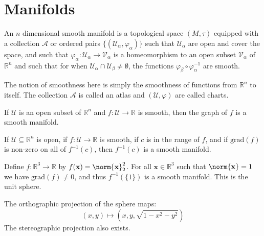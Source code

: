 \documentclass{article}                                                        %
\begin{document}
    \section{Manifolds}
        \begin{definition}
            An $n$ dimensional smooth manifold is a topological space $(M,\tau)$
            equipped with a collection $\mathcal{A}$ or ordered pairs
            $\{(\mathcal{U}_{\alpha},\varphi_{\alpha})\}$ such that
            $\mathcal{U}_{\alpha}$ are open and cover the space, and such that
            $\varphi_{\alpha}:\mathcal{U}_{\alpha}\rightarrow\mathcal{V}_{\alpha}$
            is a homeomorphism to an open subset $\mathcal{V}_{\alpha}$ of
            $\mathbb{R}^{n}$ and such that for when
            $\mathcal{U}_{\alpha}\cap\mathcal{U}_{\beta}\ne\emptyset$, the
            functions $\varphi_{\beta}\circ\varphi_{\alpha}^{\minus{1}}$
            are smooth.
        \end{definition}
        The notion of smoothness here is simply the smoothness of functions
        from $\mathbb{R}^{n}$ to itself. The collection $\mathcal{A}$ is called
        an atlas and $(\mathcal{U},\varphi)$ are called charts.
        \begin{example}
            If $\mathcal{U}$ is an open subset of $\mathbb{R}^{n}$ and
            $f:\mathcal{U}\rightarrow\mathbb{R}$ is smooth, then the
            graph of $f$ is a smooth manifold.
        \end{example}
        \begin{example}
            If $\mathcal{U}\subseteq\mathbb{R}^{n}$ is open, if
            $f:\mathcal{U}\rightarrow\mathbb{R}$ is smooth, if $c$ is in the
            range of $f$, and if $\textrm{grad}(f)$ is non-zero on all of
            $f^{\minus{1}}(c)$, then $f^{\minus{1}}(c)$ is a smooth manifold.
        \end{example}
        \begin{example}
            Define $f:\mathbb{R}^{3}\rightarrow\mathbb{R}$ by
            $f(\mathbf{x})=\norm{\mathbf{x}}_{2}^{2}$. For all
            $\mathbf{x}\in\mathbb{R}^{3}$ such that $\norm{\mathbf{x}}=1$ we
            have $\textrm{grad}(f)\ne{0}$, and thus $f^{\minus{1}}(\{1\})$ is a
            smooth manifold. This is the unit sphere.
        \end{example}
        \begin{example}
            The orthographic projection of the sphere maps:
            \begin{equation}
                (x,y)\mapsto(x,y,\sqrt{1-x^{2}-y^{2}})
            \end{equation}
            The stereographic projection also exists.
        \end{example}
\end{document}
